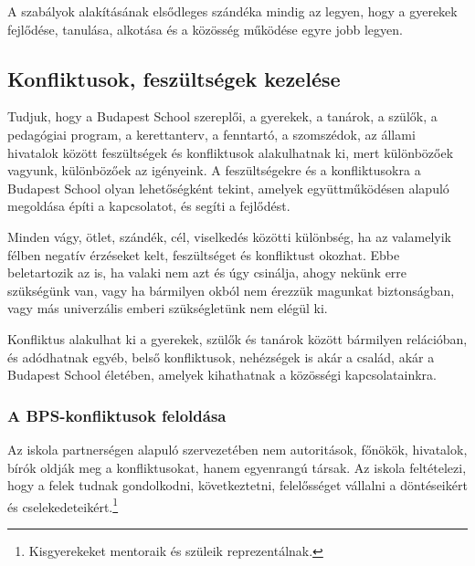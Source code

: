A szabályok alakításának elsődleges szándéka mindig az legyen, hogy a gyerekek fejlődése, tanulása, alkotása és a közösség működése egyre jobb legyen.

\subsection{Konfliktusok, feszültségek kezelése}
\label{sec:konfliktusok_kezelese}
Tudjuk, hogy a Budapest School szereplői, a gyerekek, a tanárok, a szülők, a pedagógiai program, a kerettanterv, a fenntartó, a szomszédok, az állami hivatalok  között feszültségek és konfliktusok alakulhatnak ki, mert különbözőek vagyunk, különbözőek az igényeink. A feszültségekre és a konfliktusokra a Budapest School olyan lehetőségként tekint, amelyek együttműködésen alapuló megoldása építi a kapcsolatot, és segíti a fejlődést.

Minden vágy, ötlet, szándék, cél, viselkedés közötti különbség, ha az valamelyik félben negatív érzéseket kelt, feszültséget és konfliktust okozhat. Ebbe beletartozik az is, ha valaki nem azt és úgy csinálja, ahogy nekünk erre szükségünk van, vagy ha bármilyen okból nem érezzük magunkat biztonságban, vagy más univerzális emberi szükségletünk \citep{rosenberg2003nonviolent} nem elégül ki.

Konfliktus alakulhat ki a gyerekek, szülők és tanárok között bármilyen relációban, és adódhatnak egyéb, belső konfliktusok, nehézségek is akár a család, akár a Budapest School életében, amelyek kihathatnak a közösségi kapcsolatainkra.

\subsubsection{A BPS-konfliktusok feloldása}

Az iskola partnerségen alapuló szervezetében nem autoritások, főnökök, hivatalok, bírók oldják meg a konfliktusokat, hanem egyenrangú társak. Az iskola feltételezi, hogy a felek tudnak gondolkodni, következtetni, felelősséget vállalni a döntéseikért és cselekedeteikért.\footnote{Kisgyerekeket mentoraik és szüleik reprezentálnak.}

